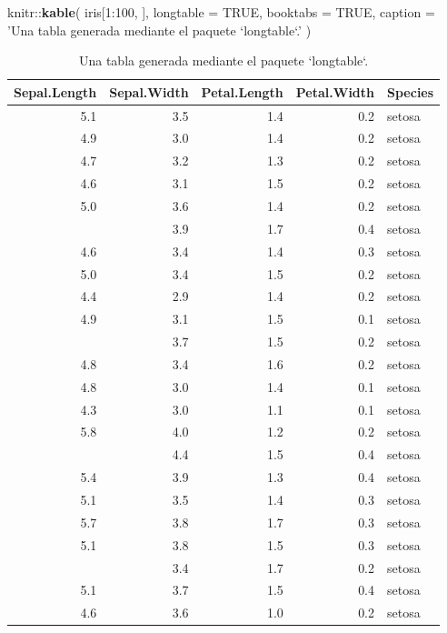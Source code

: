 \documentclass[12pt,]{krantz}
\makeatletter
\newenvironment{Shaded}{\begin{snugshade}}{\end{snugshade}}
\newcommand{\KeywordTok}[1]{\textcolor[rgb]{0.13,0.29,0.53}{\textbf{{#1}}}}
\newcommand{\DataTypeTok}[1]{\textcolor[rgb]{0.13,0.29,0.53}{{#1}}}
\newcommand{\DecValTok}[1]{\textcolor[rgb]{0.00,0.00,0.81}{{#1}}}
\newcommand{\StringTok}[1]{\textcolor[rgb]{0.31,0.60,0.02}{{#1}}}
\newcommand{\OtherTok}[1]{\textcolor[rgb]{0.56,0.35,0.01}{{#1}}}
\newcommand{\NormalTok}[1]{{#1}}
\newenvironment{kframe}{%
\medskip{}
\setlength{\fboxsep}{.8em}
 \def\at@end@of@kframe{}%
 \ifinner\ifhmode%
  \def\at@end@of@kframe{\end{minipage}}%
  \begin{minipage}{\columnwidth}%
 \fi\fi%
 \def\FrameCommand##1{\hskip\@totalleftmargin \hskip-\fboxsep
 \colorbox{shadecolor}{##1}\hskip-\fboxsep
     \hskip-\linewidth \hskip-\@totalleftmargin \hskip\columnwidth}%
 \MakeFramed {\advance\hsize-\width
   \@totalleftmargin\z@ \linewidth\hsize
   \@setminipage}}%
 {\par\unskip\endMakeFramed%
 \at@end@of@kframe}
\renewenvironment{Shaded}{\begin{kframe}}{\end{kframe}}
\theoremstyle{definition}
\theoremstyle{definition}
\theoremstyle{remark}
\makeatother
\begin{document}
\begin{Shaded}
\begin{Highlighting}[]
\NormalTok{knitr::}\KeywordTok{kable}\NormalTok{(}
  \NormalTok{iris[}\DecValTok{1}\NormalTok{:}\DecValTok{100}\NormalTok{, ], }\DataTypeTok{longtable =} \OtherTok{TRUE}\NormalTok{, }\DataTypeTok{booktabs =} \OtherTok{TRUE}\NormalTok{,}
  \DataTypeTok{caption =} \StringTok{'Una tabla generada mediante el paquete `longtable`.'}
\NormalTok{)}
\end{Highlighting}
\end{Shaded}

\begin{longtable}[t]{rrrrl}
\caption{\label{tab:longtable}Una tabla generada mediante el paquete `longtable`.}\\
\toprule
Sepal.Length & Sepal.Width & Petal.Length & Petal.Width & Species\\
\midrule
5.1 & 3.5 & 1.4 & 0.2 & setosa\\
4.9 & 3.0 & 1.4 & 0.2 & setosa\\
4.7 & 3.2 & 1.3 & 0.2 & setosa\\
4.6 & 3.1 & 1.5 & 0.2 & setosa\\
5.0 & 3.6 & 1.4 & 0.2 & setosa\\
\addlinespace
5.4 & 3.9 & 1.7 & 0.4 & setosa\\
4.6 & 3.4 & 1.4 & 0.3 & setosa\\
5.0 & 3.4 & 1.5 & 0.2 & setosa\\
4.4 & 2.9 & 1.4 & 0.2 & setosa\\
4.9 & 3.1 & 1.5 & 0.1 & setosa\\
\addlinespace
5.4 & 3.7 & 1.5 & 0.2 & setosa\\
4.8 & 3.4 & 1.6 & 0.2 & setosa\\
4.8 & 3.0 & 1.4 & 0.1 & setosa\\
4.3 & 3.0 & 1.1 & 0.1 & setosa\\
5.8 & 4.0 & 1.2 & 0.2 & setosa\\
\addlinespace
5.7 & 4.4 & 1.5 & 0.4 & setosa\\
5.4 & 3.9 & 1.3 & 0.4 & setosa\\
5.1 & 3.5 & 1.4 & 0.3 & setosa\\
5.7 & 3.8 & 1.7 & 0.3 & setosa\\
5.1 & 3.8 & 1.5 & 0.3 & setosa\\
\addlinespace
5.4 & 3.4 & 1.7 & 0.2 & setosa\\
5.1 & 3.7 & 1.5 & 0.4 & setosa\\
4.6 & 3.6 & 1.0 & 0.2 & setosa\\

\end{longtable}
\end{document}
